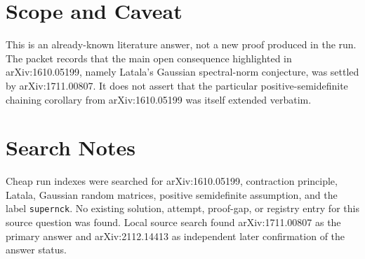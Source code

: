 \documentclass[11pt]{amsart}
\begin{document}
\section*{Scope and Caveat}

This is an already-known literature answer, not a new proof produced in
the run.  The packet records that the main open consequence highlighted in
arXiv:1610.05199, namely Latala's Gaussian spectral-norm conjecture, was
settled by arXiv:1711.00807.  It does not assert that the particular
positive-semidefinite chaining corollary from arXiv:1610.05199 was itself
extended verbatim.

\section*{Search Notes}

Cheap run indexes were searched for arXiv:1610.05199, contraction
principle, Latala, Gaussian random matrices, positive semidefinite
assumption, and the label \texttt{supernck}.  No existing solution,
attempt, proof-gap, or registry entry for this source question was found.
Local source search found arXiv:1711.00807 as the primary answer and
arXiv:2112.14413 as independent later confirmation of the answer status.
\end{document}
